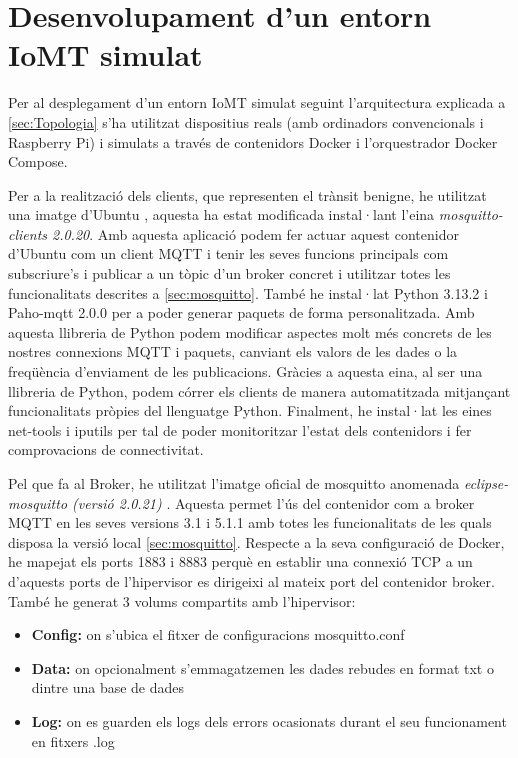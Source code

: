 \chapter{Desenvolupament d’un entorn IoMT simulat}
Per al desplegament d’un entorn IoMT simulat seguint l’arquitectura explicada a \ref{sec:Topologia} s'ha utilitzat dispositius reals (amb ordinadors convencionals i Raspberry Pi) i simulats a través de contenidors Docker i l’orquestrador Docker Compose.

Per a la realització dels clients, que representen el trànsit benigne, he utilitzat una imatge d’Ubuntu \cite{ubuntuimg}, aquesta ha estat modificada instal·lant l'eina \textit{mosquitto-clients 2.0.20}. Amb aquesta aplicació podem fer actuar aquest contenidor d'Ubuntu com un client MQTT i tenir les seves funcions principals com subscriure’s i publicar a un tòpic d’un broker concret i utilitzar totes les funcionalitats descrites a \ref{sec:mosquitto}. També he instal·lat Python 3.13.2 i Paho-mqtt 2.0.0 \cite{pahoexp} per a poder generar paquets de forma personalitzada. Amb aquesta llibreria de Python podem modificar aspectes molt més concrets de les nostres connexions MQTT i paquets, canviant els valors de les dades o la freqüència d’enviament de les publicacions. Gràcies a aquesta eina, al ser una llibreria de Python, podem córrer els clients de manera automatitzada mitjançant funcionalitats pròpies del llenguatge Python. Finalment, he instal·lat les eines net-tools i iputils per tal de poder monitoritzar l’estat dels contenidors i fer comprovacions de connectivitat.

Pel que fa al Broker, he utilitzat l’imatge oficial de mosquitto anomenada \textit{eclipse-mosquitto (versió 2.0.21)} \cite{mosquittoimg}. Aquesta permet l’ús del contenidor com a broker MQTT en les seves versions 3.1 i 5.1.1 amb totes les funcionalitats de les quals disposa la versió local \ref{sec:mosquitto}. Respecte a la seva configuració de Docker, he mapejat els ports 1883 i 8883 perquè en establir una connexió TCP a un d’aquests ports de l'hipervisor es dirigeixi al mateix port del contenidor broker. També he generat 3 volums compartits amb l'hipervisor:
\begin{itemize}
    \item \textbf{Config:} on s’ubica el fitxer de configuracions mosquitto.conf
    \item \textbf{Data:} on opcionalment s'emmagatzemen les dades rebudes en format txt o dintre una base de dades
    \item \textbf{Log:} on es guarden els logs dels errors ocasionats durant el seu funcionament en fitxers .log
\end{itemize} 


